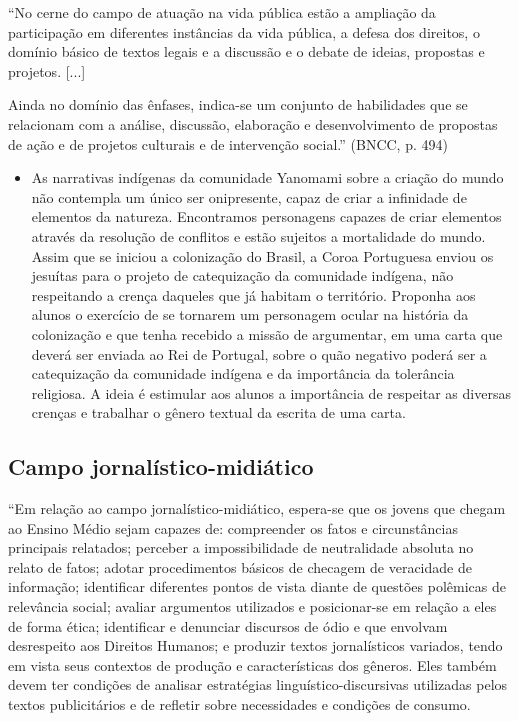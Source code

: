 \documentclass[12pt]{extarticle}
\begin{document}
``No cerne do campo de atuação na vida pública estão a ampliação da
participação em diferentes instâncias da vida pública, a defesa dos
direitos, o domínio básico de textos legais e a discussão e o debate de
ideias, propostas e projetos. {[}...{]}

Ainda no domínio das ênfases, indica-se um conjunto de habilidades que
se relacionam com a análise, discussão, elaboração e desenvolvimento de
propostas de ação e de projetos culturais e de intervenção social.''
(BNCC, p. 494)

\begin{itemize}
\item
  As narrativas indígenas da comunidade Yanomami sobre a criação do
  mundo não contempla um único ser onipresente, capaz de criar a
  infinidade de elementos da natureza. Encontramos personagens capazes
  de criar elementos através da resolução de conflitos e estão sujeitos
  a mortalidade do mundo. Assim que se iniciou a colonização do Brasil,
  a Coroa Portuguesa enviou os jesuítas para o projeto de catequização
  da comunidade indígena, não respeitando a crença daqueles que já
  habitam o território. Proponha aos alunos o exercício de se tornarem
  um personagem ocular na história da colonização e que tenha recebido a
  missão de argumentar, em uma carta que deverá ser enviada ao Rei de
  Portugal, sobre o quão negativo poderá ser a catequização da
  comunidade indígena e da importância da tolerância religiosa. A ideia
  é estimular aos alunos a importância de respeitar as diversas crenças
  e trabalhar o gênero textual da escrita de uma carta.
\end{itemize}


\subsection{Campo jornalístico-midiático }

``Em relação ao campo jornalístico-midiático, espera-se que os jovens
que chegam ao Ensino Médio sejam capazes de: compreender os fatos e
circunstâncias principais relatados; perceber a impossibilidade de
neutralidade absoluta no relato de fatos; adotar procedimentos básicos
de checagem de veracidade de informação; identificar diferentes pontos
de vista diante de questões polêmicas de relevância social; avaliar
argumentos utilizados e posicionar-se em relação a eles de forma ética;
identificar e denunciar discursos de ódio e que envolvam desrespeito aos
Direitos Humanos; e produzir textos jornalísticos variados, tendo em
vista seus contextos de produção e características dos gêneros. Eles
também devem ter condições de analisar estratégias
linguístico-discursivas utilizadas pelos textos publicitários e de
refletir sobre necessidades e condições de consumo.
\end{document}
